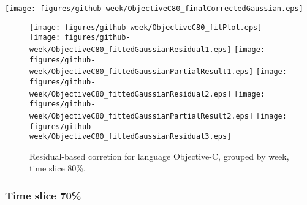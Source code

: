 \begin{center}
{\texttt{[image: figures/github-week/ObjectiveC80\_finalCorrectedGaussian.eps]}}
\end{center}

\FloatBarrier

\begin{figure}[t]
\centering
{}
{\texttt{[image: figures/github-week/ObjectiveC80\_fitPlot.eps]}}
{\texttt{[image: figures/github-week/ObjectiveC80\_fittedGaussianResidual1.eps]}}
{\texttt{[image: figures/github-week/ObjectiveC80\_fittedGaussianPartialResult1.eps]}}
{\texttt{[image: figures/github-week/ObjectiveC80\_fittedGaussianResidual2.eps]}}
{\texttt{[image: figures/github-week/ObjectiveC80\_fittedGaussianPartialResult2.eps]}}
{\texttt{[image: figures/github-week/ObjectiveC80\_fittedGaussianResidual3.eps]}}
\caption{Residual-based corretion for language Objective-C, grouped by week, time slice 80\%.}
\end{figure}


\FloatBarrier


\subsubsection{Time slice 70\%}

